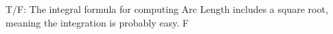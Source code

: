 {T/F: The integral formula for computing Arc Length includes a square root, meaning the integration is probably easy.}
{F}
